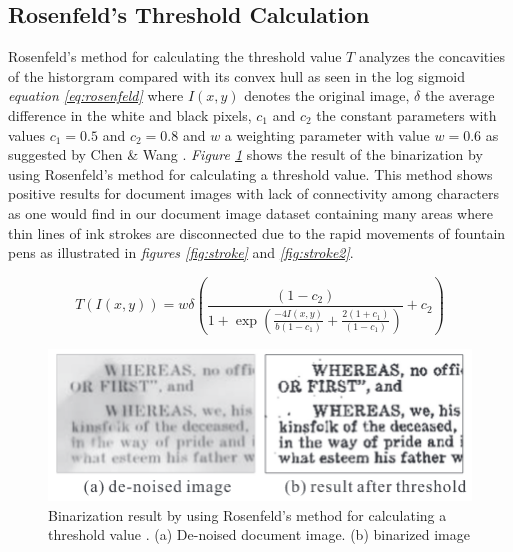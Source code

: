\documentclass[11pt]{article}
\begin{document}
			\subsection{Rosenfeld's Threshold Calculation}
				Rosenfeld's method \cite{chen2017broken} for calculating the threshold value $T$ analyzes the concavities of the historgram compared with its convex hull as seen in the log sigmoid \textit{equation \ref{eq:rosenfeld}} \cite{chen2017broken} where $I(x,y)$ denotes the original image, $\delta$ the average difference in the white and black pixels, $c_1$ and $c_2$ the constant parameters with values $c_1=0.5$ and $c_2=0.8$ and $w$ a weighting parameter with value $w=0.6$ as suggested by Chen \& Wang  \cite{chen2017broken}. \textit{Figure \ref{fig:rosenfeld}} shows the result of the binarization by using Rosenfeld's method for calculating a threshold value. This method shows positive results for document images with lack of connectivity among characters as one would find in our document image dataset containing many areas where thin lines of ink strokes are disconnected due to the rapid movements of fountain pens as illustrated in \textit{figures \ref{fig:stroke}} and \textit{\ref{fig:stroke2}}.

				\begin{Large}
				\begin{equation} \label{eq:rosenfeld}
				T(I(x,y)) = w \delta (\frac{(1 - c_2)}{1 + \exp(\frac{-4I(x, y)}{b(1 - c_1)} + \frac{2(1 + c_1)}{(1 - c_1)})} + c_2)
				\end{equation}
				\end{Large}

				\begin{figure}[!htb]
				 \centering
				 \includegraphics[scale=1]{rosenfeld.png}
				 \caption{Binarization result by using Rosenfeld's method for calculating a threshold value \cite{chen2017broken}. (a) De-noised document image. (b) binarized image} %
				 \label{fig:rosenfeld} %
				\end{figure}
\end{document}
